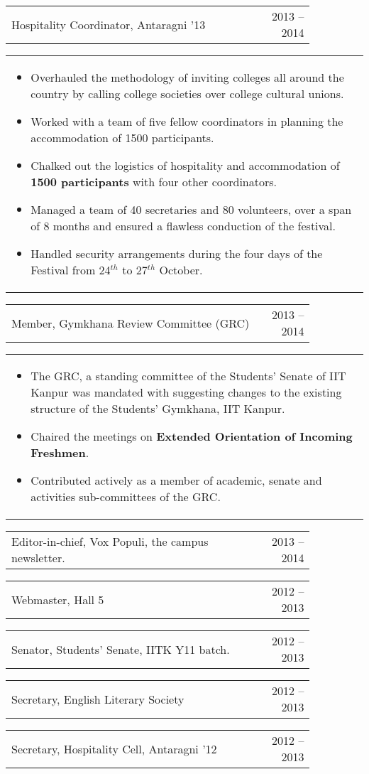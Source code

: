 \documentclass[a4paper,10pt]{article} %
\newcommand{\iproject}[3]{
    \begin{tabular}{p{0.85\linewidth}r}
        \textcolor{NavyBlue}{#2} & \multicolumn{1}{m{3cm}}{\raggedleft \textsc{#1}}\\
    \end{tabular}
    \begin{tabular}{p{\linewidth}}
    \vspace{-0.3cm}
        \footnotesize{#3}
    \end{tabular}
    \vspace{-0.5cm}
}
\newcommand{\skill}[2]{
    \begin{tabular}{p{0.85\linewidth}r}
        #2 & \multicolumn{1}{m{3cm}}{\raggedleft \textsc{#1}}\\
    \end{tabular}
    \vspace{-0.5cm}
}
\begin{document}
\iproject {2013 -- 2014}
          {Hospitality Coordinator, Antaragni '13}
          {
               \begin{itemize}[leftmargin=0.5cm]
                   \item Overhauled the methodology of inviting colleges all around the country by calling college societies over college cultural unions.
                   \item Worked with a team of five fellow coordinators in planning the accommodation of 1500 participants.
                   \item Chalked out the logistics of hospitality and accommodation of \textbf{1500 participants} with four other coordinators.
                   \item Managed a team of 40 secretaries and 80 volunteers, over a span of 8 months and ensured a flawless conduction of the festival.
                   \item Handled security arrangements during the four days of the Festival from 24$^{th}$ to 27$^{th}$ October.
               \end{itemize}
          }

\iproject {2013 -- 2014}
          {Member, Gymkhana Review Committee (GRC)}
          {
               \begin{itemize}[leftmargin=0.5cm]
                   \item The GRC, a standing committee of the Students' Senate of IIT Kanpur was mandated with
                       suggesting changes to the existing structure of the Students' Gymkhana, IIT Kanpur.
                   \item Chaired the meetings on \textbf{Extended Orientation of Incoming Freshmen}.
                   \item Contributed actively as a member of academic, senate and activities sub-committees of the GRC.
               \end{itemize}
          }

\skill {2013 -- 2014}
       {Editor-in-chief, Vox Populi, the campus newsletter.}

\skill {2012 -- 2013}
       {Webmaster, Hall 5}

\skill {2012 -- 2013}
       {Senator, Students' Senate, IITK Y11 batch.}

\skill {2012 -- 2013}
       {Secretary, English Literary Society}

\skill {2012 -- 2013}
       {Secretary, Hospitality Cell, Antaragni '12}
\end{document}
